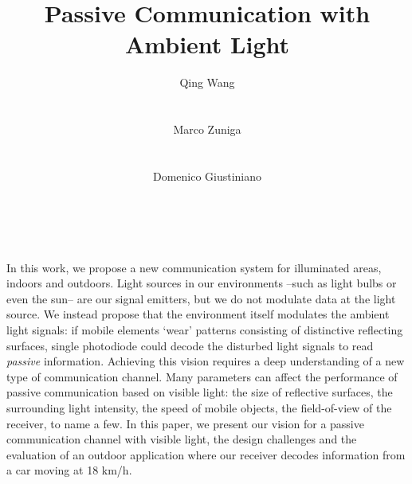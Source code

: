 \documentclass[10pt]{sig-alternate-05-2015}
\begin{document}




\title{Passive Communication with Ambient Light}

\author{
	\alignauthor 
	Qing Wang\\
	\\
	\\
\alignauthor
	Marco Zuniga \\
	\\
	\\
\alignauthor
	Domenico Giustiniano \\
	\\
	\\
}
\maketitle

\abstract
In this work, we propose a new communication system for illuminated areas, indoors and outdoors.  
Light sources in our environments --such as light bulbs or even the sun-- are our signal emitters, but we do not modulate data at the light source. We instead propose that the environment itself modulates the {ambient} light signals: if mobile elements `wear' patterns consisting of distinctive reflecting surfaces, single photodiode could decode the disturbed light signals to read \emph{passive} information. Achieving this vision requires a deep understanding of a new type of communication channel. Many parameters can affect the performance of passive communication based on visible light: the size of reflective surfaces, the surrounding light intensity, the speed of mobile objects, the field-of-view of the receiver, to name a few. In this paper, we present our vision for a passive communication channel with visible light, the design challenges and the evaluation of an outdoor application where our receiver decodes information from a car moving at 18 km/h.
\end{document}
